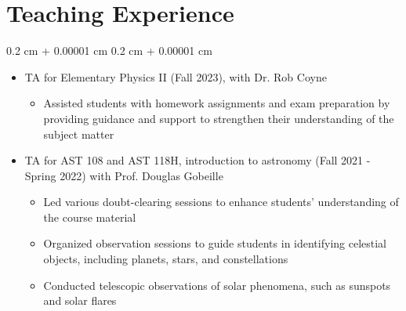 \documentclass[10pt, letterpaper]{article}
\newenvironment{highlightsforbulletentries}{
    \begin{itemize}[
        topsep=0.10 cm,
        parsep=0.10 cm,
        partopsep=0pt,
        itemsep=0pt,
        leftmargin=10pt
    ]
}{
    \end{itemize}
}
\newenvironment{onecolentry}{
    \begin{adjustwidth}{
        0.2 cm + 0.00001 cm
    }{
        0.2 cm + 0.00001 cm
    }
}{
    \end{adjustwidth}
}
\begin{document}
\section{Teaching Experience}
\begin{onecolentry}
    \begin{highlightsforbulletentries}
      \item TA for Elementary Physics II (Fall 2023), with Dr. Rob Coyne
      \begin{itemize}
        \item Assisted students with homework assignments and exam preparation by providing guidance and support to strengthen their understanding of the subject matter
      \end{itemize}

      \item TA for AST 108 and AST 118H, introduction to astronomy (Fall 2021 - Spring 2022) with Prof. Douglas Gobeille
      \begin{itemize}
        \item Led various doubt-clearing sessions to enhance students' understanding of the course material
        \item Organized observation sessions to guide students in identifying celestial objects, including planets, stars, and constellations
        \item Conducted telescopic observations of solar phenomena, such as sunspots and solar flares
      \end{itemize}   
    \end{highlightsforbulletentries}
\end{onecolentry}

\vspace{0.2 cm}

\end{document}
